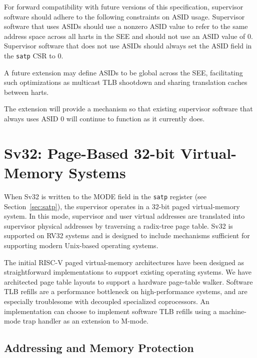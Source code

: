 For forward compatibility with future versions of this specification,
supervisor software should adhere to the following constraints on ASID usage.
Supervisor software that uses ASIDs should use a nonzero ASID value to refer to
the same address space across all harts in the SEE and should not use an ASID
value of 0.  Supervisor software that does not use ASIDs should always set the
ASID field in the {\tt satp} CSR to 0.

\begin{commentary}
A future extension may define ASIDs to be global across the SEE, facilitating
such optimizations as multicast TLB shootdown and sharing translation caches
between harts.

The extension will provide a mechanism so that existing supervisor software
that always uses ASID 0 will continue to function as it currently does.
\end{commentary}

\section{Sv32: Page-Based 32-bit Virtual-Memory Systems}
\label{sec:sv32}

When Sv32 is written to the MODE field in the {\tt satp} register (see
Section~\ref{sec:satp}), the supervisor operates in a 32-bit paged
virtual-memory system.  In this mode, supervisor and user virtual addresses
are translated into supervisor physical addresses by traversing a radix-tree
page table.  Sv32 is supported on RV32 systems and is designed to include
mechanisms sufficient for supporting modern Unix-based operating systems.

\begin{commentary}
The initial RISC-V paged virtual-memory architectures have been
designed as straightforward implementations to support existing
operating systems.  We have architected page table layouts to support
a hardware page-table walker.  Software TLB refills are a performance
bottleneck on high-performance systems, and are especially troublesome
with decoupled specialized coprocessors.  An implementation can choose
to implement software TLB refills using a machine-mode trap handler as
an extension to M-mode.
\end{commentary}

\subsection{Addressing and Memory Protection}
\label{sec:translation}

